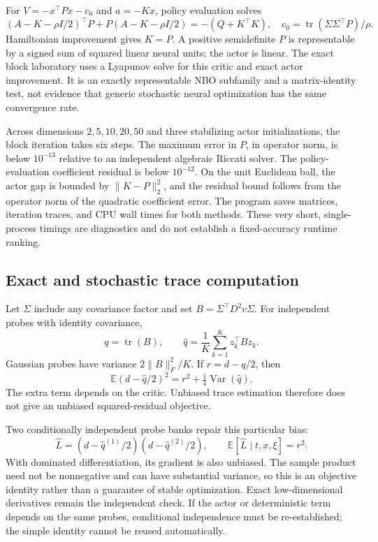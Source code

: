 \documentclass[ecta,draft]{econsocart}
\theoremstyle{definition}
\theoremstyle{remark}
\newcommand{\E}{\mathbb E}
\newcommand{\tr}{\operatorname{tr}}
\begin{document}
For $V=-x^\top Px-c_0$ and $a=-Kx$, policy evaluation solves
\begin{equation}\label{eq:lyapunov}
 (A-K-\rho I/2)^\top P+P(A-K-\rho I/2)=-(Q+K^\top K),
 \quad c_0=\tr(\Sigma\Sigma^\top P)/\rho.
\end{equation}
Hamiltonian improvement gives $K=P$. A positive semidefinite $P$ is representable by a signed sum of squared linear neural units; the actor is linear. The exact block laboratory uses a Lyapunov solve for this critic and exact actor improvement. It is an exactly representable NBO subfamily and a matrix-identity test, not evidence that generic stochastic neural optimization has the same convergence rate.

Across dimensions $2,5,10,20,50$ and three stabilizing actor initializations, the block iteration takes six steps. The maximum error in $P$, in operator norm, is below $10^{-13}$ relative to an independent algebraic Riccati solver. The policy-evaluation coefficient residual is below $10^{-12}$. On the unit Euclidean ball, the actor gap is bounded by $\|K-P\|_2^2$, and the residual bound follows from the operator norm of the quadratic coefficient error. The program saves matrices, iteration traces, and CPU wall times for both methods. These very short, single-process timings are diagnostics and do not establish a fixed-accuracy runtime ranking.




\subsection{Exact and stochastic trace computation}
Let $\Sigma$ include any covariance factor and set $B=\Sigma^\top D^2v\Sigma$. For independent probes with identity covariance,
\begin{equation}\label{eq:trace}
 q=\tr(B),\qquad \widehat q=\frac1K\sum_{k=1}^Kz_k^\top Bz_k.
\end{equation}
Gaussian probes have variance $2\|B\|_F^2/K$. If $r=d-q/2$, then
\begin{equation}\label{eq:tracebias}
 \E(d-\widehat q/2)^2=r^2+\tfrac14\operatorname{Var}(\widehat q).
\end{equation}
The extra term depends on the critic. Unbiased trace estimation therefore does not give an unbiased squared-residual objective.

Two conditionally independent probe banks repair this particular bias:
\begin{equation}\label{eq:crossprobe}
 \widehat L=(d-\widehat q^{(1)}/2)(d-\widehat q^{(2)}/2),
 \qquad\E[\widehat L\mid t,x,\xi]=r^2.
\end{equation}
With dominated differentiation, its gradient is also unbiased. The sample product need not be nonnegative and can have substantial variance, so this is an objective identity rather than a guarantee of stable optimization. Exact low-dimensional derivatives remain the independent check. If the actor or deterministic term depends on the same probes, conditional independence must be re-established; the simple identity cannot be reused automatically.
\end{document}
